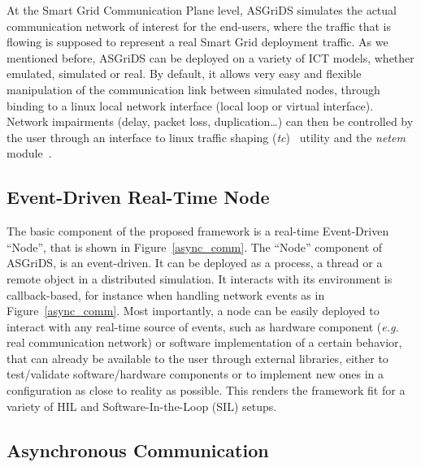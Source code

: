 \documentclass[conference]{IEEEtran}
\begin{document}
At the Smart Grid Communication Plane level, ASGriDS simulates the actual communication network of interest for the end-users, where the traffic that is flowing is supposed to represent a real Smart Grid deployment traffic.
As we mentioned before, ASGriDS can be deployed on a variety of ICT models, whether emulated, simulated or real. By default, it allows very easy and flexible manipulation of the communication link between simulated nodes, through binding to a linux local network interface (local loop or virtual interface). Network impairments (delay, packet loss, duplication\dots) can then be controlled by the user through an interface to linux traffic shaping (\textit{tc})~\cite{hubert2002linux} utility and the \textit{netem} module~\cite{hemminger2005network}.


\subsection{Event-Driven Real-Time Node}\label{rt_node}

The basic component of the proposed framework is a real-time Event-Driven ``Node'', that is shown in Figure~\ref{async_comm}.
The ``Node'' component of ASGriDS, is an event-driven. It can be deployed as a process, a thread or a remote object in a distributed simulation. It interacts with its environment is callback-based, for instance when handling network events as in Figure~\ref{async_comm}. Most importantly, a node can be easily deployed to interact with any real-time source of events, such as hardware component (\emph{e.g.} real communication network) or software implementation of a certain behavior, that can already be available to the user through external libraries, either to test/validate software/hardware components or to implement new ones in a configuration as close to reality as possible. This renders the framework fit for a variety of HIL and Software-In-the-Loop (SIL) setups.



\subsection{Asynchronous Communication} \label{AsyncComm}
\end{document}

